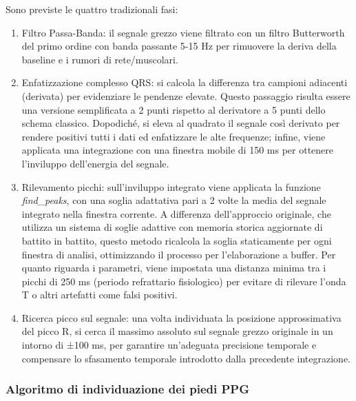 \documentclass[11pt,a4paper]{article}
\begin{document}
Sono previste le quattro tradizionali fasi:
\begin{enumerate}
    \item Filtro Passa-Banda: il segnale grezzo viene filtrato con un filtro Butterworth del primo ordine con banda passante 5-15 Hz per rimuovere la deriva della baseline e i rumori di rete/muscolari.
    \item Enfatizzazione complesso QRS: si calcola la differenza tra campioni adiacenti (derivata) per evidenziare le pendenze elevate. Questo passaggio risulta essere una versione semplificata a 2 punti rispetto al derivatore a 5 punti dello schema classico. Dopodiché, si eleva al quadrato il segnale così derivato per rendere positivi tutti i dati ed enfatizzare le alte frequenze; infine, viene applicata una integrazione con una finestra mobile di 150 ms per ottenere l'inviluppo dell'energia del segnale.
    \item Rilevamento picchi: sull'inviluppo integrato viene applicata la funzione \textit{find\_peaks}, con una soglia adattativa pari a 2 volte la media del segnale integrato nella finestra corrente. A differenza dell'approccio originale, che utilizza un sistema di soglie adattive con memoria storica aggiornate di battito in battito, questo metodo ricalcola la soglia staticamente per ogni finestra di analisi, ottimizzando il processo per l'elaborazione a buffer. Per quanto riguarda i parametri, viene impostata una distanza minima tra i picchi di 250 ms (periodo refrattario fisiologico) per evitare di rilevare l'onda T o altri artefatti come falsi positivi. 
    \item Ricerca picco sul segnale: una volta individuata la posizione approssimativa del picco R, si cerca il massimo assoluto sul segnale grezzo originale in un intorno di ±100 ms, per garantire un'adeguata precisione temporale e compensare lo sfasamento temporale introdotto dalla precedente integrazione.
\end{enumerate}

\subsubsection{Algoritmo di individuazione dei piedi PPG}
\end{document}
